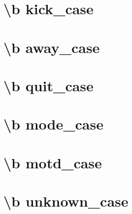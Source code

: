 \documentclass[twoside]{book}
\begin{document}
\chapter{\textbackslash{}b kick\-\_\-case}
\label{kick_case}
\hypertarget{kick_case}{}

\chapter{\textbackslash{}b away\-\_\-case}
\label{away_case}
\hypertarget{away_case}{}

\chapter{\textbackslash{}b quit\-\_\-case}
\label{quit_case}
\hypertarget{quit_case}{}

\chapter{\textbackslash{}b mode\-\_\-case}
\label{mode_case}
\hypertarget{mode_case}{}

\chapter{\textbackslash{}b motd\-\_\-case}
\label{motd_case}
\hypertarget{motd_case}{}

\chapter{\textbackslash{}b unknown\-\_\-case}
\label{unknown_case}
\hypertarget{unknown_case}{}


\newpage
{}
{}
\printindex
\end{document}
